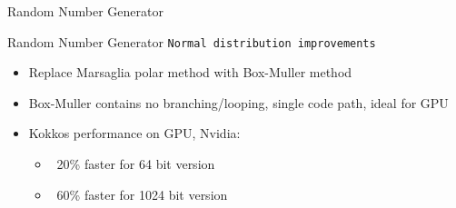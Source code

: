 
\begin{frame}[fragile]

  {\Huge Random Number Generator}

\end{frame}


\begin{frame}[fragile]{Random Number Generator}
\texttt{Normal distribution improvements}
\begin{itemize}
\item Replace Marsaglia polar method with Box-Muller method 
\item Box-Muller contains no branching/looping, single code path, ideal for GPU
\item Kokkos performance on GPU, Nvidia: 
\begin{itemize}
\item ~20\% faster for 64 bit version
\item ~60\% faster for 1024 bit version
\end{itemize}
\end{itemize}
\end{frame}

